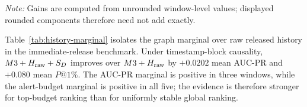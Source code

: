 \documentclass[11pt]{article}
\theoremstyle{definition}
\theoremstyle{remark}
\begin{document}
\begin{table}[h]
\centering
\caption{Block-causal global gains over $M3$ across five chronological 100k windows.}
\label{tab:global-m3}

{\footnotesize\emph{Note:} Gains are computed from unrounded window-level values; displayed rounded components therefore need not add exactly.}
\end{table}

Table~\ref{tab:history-marginal} isolates the graph marginal over raw released history in the immediate-release benchmark. Under timestamp-block causality, $M3+H_{\rm raw}+S_D$ improves over $M3+H_{\rm raw}$ by $+0.0202$ mean AUC-PR and $+0.080$ mean $P@1\%$. The AUC-PR marginal is positive in three windows, while the alert-budget marginal is positive in all five; the evidence is therefore stronger for top-budget ranking than for uniformly stable global ranking.

\begin{table}[h]
\centering
\caption{Graph marginal over raw released history under timestamp-block causality.}
\label{tab:history-marginal}
\end{table}
\end{document}
